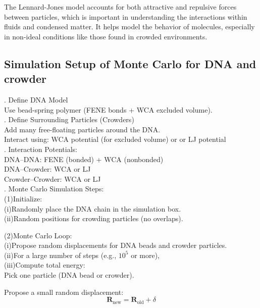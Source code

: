 \documentclass[12pt]{article}
\begin{document}
\begin{flushleft}
The Lennard-Jones model accounts for both attractive and repulsive forces between particles, which is important in understanding the interactions within fluids and condensed matter. It helps model the behavior of molecules, especially in non-ideal conditions like those found in crowded environments. 

\subsection*{Simulation Setup of Monte Carlo for DNA and crowder}
. Define DNA Model\\
Use bead-spring polymer (FENE bonds + WCA excluded volume).\\
. Define Surrounding Particles (Crowders)\\
Add many free-floating particles around the DNA.\\
Interact using: WCA potential (for excluded volume) or or LJ potential\\

. Interaction Potentials:\\
DNA–DNA: FENE (bonded) + WCA (nonbonded)\\
DNA–Crowder: WCA or LJ\\
Crowder–Crowder: WCA or LJ\\



. Monte Carlo Simulation Steps:\\
(1)Initialize:\\
\setlength{\parindent}{6em} (i)Randomly place the DNA chain in the simulation box.\\
   (ii)Random positions for crowding particles (no overlaps).

\setlength{\parindent}{0em} 

\setlength{\parindent}{4em}(2)Monte Carlo Loop:\\
\setlength{\parindent}{6em}   (i)Propose random displacements for DNA beads and crowder particles.\\

(ii)For a large number of steps (e.g., $10^{5}$ or more),\\
(iii)Compute total energy:\\
\setlength{\parindent}{8em}Pick one particle (DNA bead or crowder).

Propose a small random displacement:
\begin{equation}
\mathbf{R}_{\text{new}} = \mathbf{R}_{\text{old}} + \delta
\end{equation}


\end{flushleft}
\end{document}
